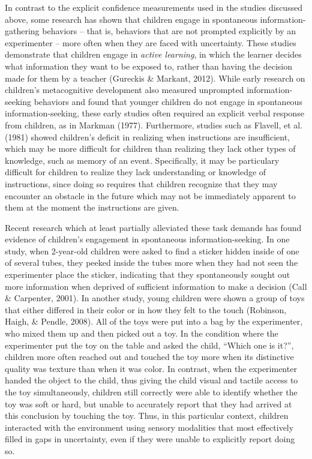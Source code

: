 \documentclass[,man,floatsintext]{apa6}
\begin{document}
In contrast to the explicit confidence measurements used in the studies discussed above, some research has shown that children engage in spontaneous information-gathering behaviors -- that is, behaviors that are not prompted explicitly by an experimenter -- more often when they are faced with uncertainty. These studies demonstrate that children engage in \emph{active learning}, in which the learner decides what information they want to be exposed to, rather than having the decision made for them by a teacher (Gureckis \& Markant, 2012). While early research on children's metacognitive development also measured unprompted information-seeking behaviors and found that younger children do not engage in spontaneous information-seeking, these early studies often required an explicit verbal response from children, as in Markman (1977). Furthermore, studies such as Flavell, et al. (1981) showed children's deficit in realizing when instructions are insufficient, which may be more difficult for children than realizing they lack other types of knowledge, such as memory of an event. Specifically, it may be particulary difficult for children to realize they lack understanding or knowledge of instructions, since doing so requires that children recognize that they may encounter an obstacle in the future which may not be immediately apparent to them at the moment the instructions are given.

Recent research which at least partially alleviated these task demands has found evidence of children's engagement in spontaneous information-seeking. In one study, when 2-year-old children were asked to find a sticker hidden inside of one of several tubes, they peeked inside the tubes more when they had not seen the experimenter place the sticker, indicating that they spontaneously sought out more information when deprived of sufficient information to make a decision (Call \& Carpenter, 2001). In another study, young children were shown a group of toys that either differed in their color or in how they felt to the touch (Robinson, Haigh, \& Pendle, 2008). All of the toys were put into a bag by the experimenter, who mixed them up and then picked out a toy. In the condition where the experimenter put the toy on the table and asked the child, \enquote{Which one is it?}, children more often reached out and touched the toy more when its distinctive quality was texture than when it was color. In contrast, when the experimenter handed the object to the child, thus giving the child visual and tactile access to the toy simultaneously, children still correctly were able to identify whether the toy was soft or hard, but unable to accurately report that they had arrived at this conclusion by touching the toy. Thus, in this particular context, children interacted with the environment using sensory modalities that most effectively filled in gaps in uncertainty, even if they were unable to explicitly report doing so.
\end{document}

